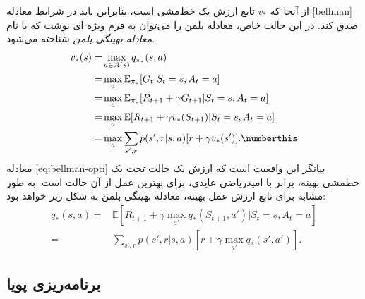 از آنجا که $v_*$ تابع ارزش یک خط‌مشی است، بنابراین باید در شرایط معادله \ref{bellman} صدق کند.
در این حالت خاص، معادله بلمن را می‌توان به فرم ویژه ای نوشت که با نام
 \textit{معادله بهینگی بلمن}
شناخته می‌شود.
\begin{align}
  v_{*}(s)= &\max_{a \in \EuScript{A}(s)} q_{\pi_*}(s,a) \nonumber \\
      =& \max_{a} \mathbb{E}_{\pi_*} [G_t|S_t=s, A_t=a] \nonumber \\ 
      =& \max_{a} \mathbb{E}_{\pi_*} [R_{t+1} + \gamma G_{t+1} | S_t=s, A_t=a] \nonumber \\ 
      =& \max_{a} \mathbb{E} [R_{t+1} + \gamma v_*(S_{t+1}) | S_t= s, A_t = a] \nonumber \\
      =& \max_{a} \sum_{s',r} p(s',r|s,a) [r + \gamma v_*(s')]. \numberthis
\label{eq:bellman-opti}
\end{align}
معادله 
\ref{eq:bellman-opti}
 بیانگر این واقعیت است که ارزش یک حالت تحت یک خط\nf مشی بهینه، برابر با امیدریاضی عایدی، برای بهترین عمل از آن حالت است. به طور مشابه برای تابع ارزش عمل بهینه، معادله بهینگی بلمن به شکل زیر خواهد بود:
\begin{align}
q_*(s,a) =& \mathbb{E}\left[R_{t+1} + \gamma \max_{a'} q_*(S_{t+1},a')| S_t=s, A_t=a \right] \nonumber\\
=& \sum_{s',r} p(s',r|s,a) \left[r + \gamma \max_{a'} q_*(s',a')\right] 
\label{eq:2}.
\end{align}


\subsection{برنامه‌ریزی پویا}


